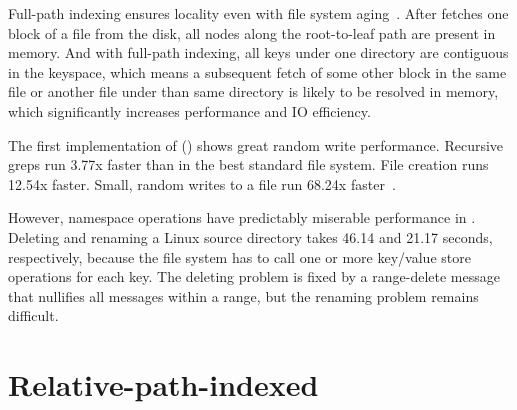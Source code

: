 Full-path indexing ensures locality even with file system aging~\citep{betrfs3}.
After \betrfs fetches one block of a file from the disk, all nodes along the
root-to-leaf path are present in memory.
And with full-path indexing, all keys under one directory are contiguous in the
keyspace, which means a subsequent fetch of some other block in the same file or
another file under than same directory is likely to be resolved in memory,
which significantly increases performance and IO efficiency.

The first implementation of \betrfs (\betrfsOne) shows great random write
performance.
Recursive greps run 3.77x faster than in the best standard file system.
File creation runs 12.54x faster.
Small, random writes to a file run 68.24x faster~\citep{betrfs1tos}.

However, namespace operations have predictably miserable performance in
\betrfsOne.
Deleting and renaming a Linux source directory takes 46.14 and 21.17 seconds,
respectively, because the file system has to call one or more key/value store
operations for each key.
The deleting problem is fixed by a range-delete message that nullifies all
messages within a range, but the renaming problem remains difficult.

\section{Relative-path-indexed \betrfs}
\label{sec:rpi}

